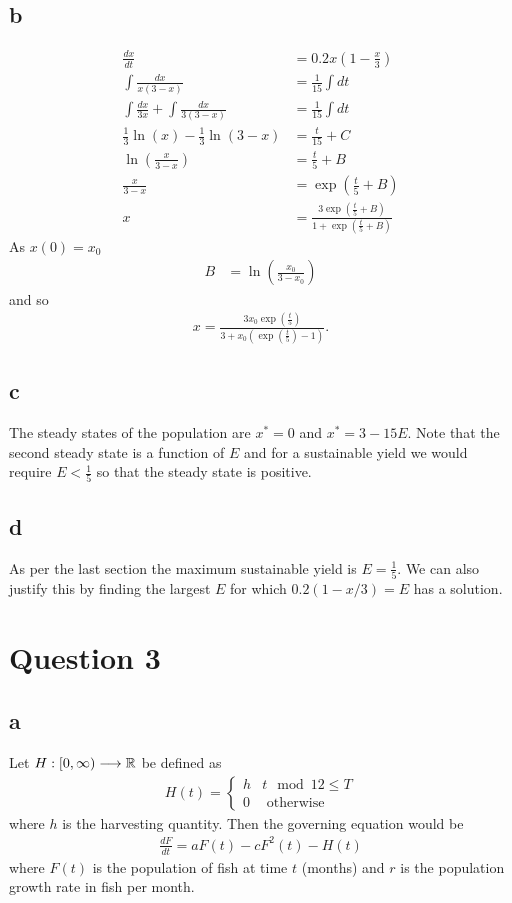 \documentclass{unswmaths}
\begin{document}
\subsection*{b}
	\begin{align*}
		\frac{dx}{dt} &= 0.2x\left( 1 - \frac{x}{3} \right) \\
		\int \frac{dx}{x(3-x)} &= \frac{1}{15} \int dt \\
		\int \frac{dx}{3x} + \int \frac{dx}{3(3-x)} &= \frac{1}{15} \int dt \\
		\frac{1}{3} \ln(x) - \frac{1}{3} \ln(3-x) &= \frac{t}{15} + C \\
		\ln \left( \frac{x}{3-x} \right) &= \frac{t}{5} + B \\
		\frac{x}{3-x} &= \exp(\frac{t}{5} + B) \\
		x &= \frac{3\exp(\frac{t}{5} + B)}{1 + \exp(\frac{t}{5} + B)}
	\end{align*}
	As $ x(0) = x_0 $
	\begin{align*}
		B &= \ln \left( \frac{x_0}{3-x_0} \right)
	\end{align*}
	and so
	\begin{align*}
		x = \frac{3 x_0 \exp(\frac{t}{5})}{3 + x_0 (\exp(\frac{t}{5}) - 1)}.
	\end{align*}
\subsection*{c}
	The steady states of the population are
	$ x^* = 0 $ and $ x^* = 3 - 15E $. Note that the second steady state is a function of $ E $ and for a sustainable yield we would require $ E < \frac{1}{5} $ so that the steady state is positive.
	
\subsection*{d}
	As per the last section the maximum sustainable yield is $ E = \frac{1}{5} $.
    We can also justify this by finding the largest $ E $ for which $ 0.2(1- x / 3) = E $ has a solution. 
\section*{Question 3}
\subsection*{a}
Let $ H : [0, \infty) \longrightarrow \mathbb{R} $ be defined as
\begin{align*}
    H(t) = 
    \begin{cases}
        h & t \mod 12 \leq T \\
        0 & \text{ otherwise }
    \end{cases}
\end{align*}
where $ h $ is the harvesting quantity. 
Then the governing equation would be
\begin{align*}
    \frac{dF}{dt} = aF(t) - cF^2(t) - H(t)
\end{align*}
where $ F(t) $ is the population of fish at time $ t $ (months) and $ r $ is the population growth rate in fish per month.
\end{document}
